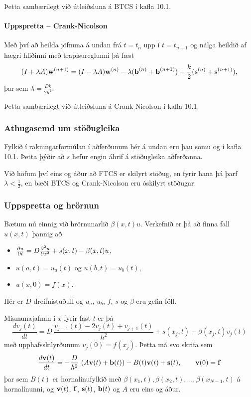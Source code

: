 \documentclass[icelandic,a4paper,12pt]{article}
\begin{document}
    \smallskip
    Þetta sambærilegt við útleiðsluna á BTCS í kafla 10.1.
  
  
\paragraph{Uppspretta -- Crank-Nicolson}
   Með því að heilda jöfnuna á undan frá $t=t_n$ upp í $t=t_{n+1}$
   og nálga heildið af hægri hliðinni með trapisureglunni þá fæst
   $$
     (I+\lambda A)\mbox{${\bf w}$}^{(n+1)} = (I-\lambda A)\mbox{${\bf w}$}^{(n)} 
     - \lambda (\mbox{${\bf b}$}^{(n)}+\mbox{${\bf b}$}^{(n+1)}) + \frac k2(\mbox{${\bf s}$}^{(n)}+\mbox{${\bf s}$}^{(n+1)}),
    $$
þar sem $\lambda = \frac{Dk}{2h^2}$. \pause
    
    \smallskip
    Þetta sambærilegt við útleiðsluna á Crank-Nicolson í kafla 10.1.
  
  
  \subsubsection{Athugasemd um stöðugleika}
   Fylkið í rakningarformúlan í aðferðunum hér á undan eru þau sömu og í
   kafla 10.1. Þetta þýðir að $s$ hefur engin áhrif á stöðugleika aðferðanna.
   \pause
   \medskip
   
   Við höfum því eins og áður að FTCS er skilyrt stöðug, en fyrir hana þá þarf 
   $\lambda < \frac 12$, en bæði BTCS og Crank-Nicolson eru 
   óskilyrt stöðugar.
  

  \subsubsection{Uppspretta og hrörnun}
   Bætum nú einnig við hrörnunarlið $\beta(x,t)u$. \pause
   Verkefnið er þá að finna fall $u(x,t)$ þannig að 
   \begin{itemize}
 \item $\frac{{\partial} u}{{\partial} t} =  D \frac{{\partial}^2 u}{{\partial} x^2} + s(x,t) - \beta(x,t)u$,
 \item $u(a,t) = u_a(t)$ og $u(b,t) = u_b(t)$, 
 \item $u(x,0) = f(x)$.
\end{itemize}
Hér er $D$ dreifnistuðull og $u_a$, $u_b$, $f$, $s$ og $\beta$ eru gefin
föll.



Mismunajafnan í $x$ fyrir fast $t$ er þá 
 $$ 
 \frac{d v_j(t)}{d t} =  D\  \frac{v_{j-1}(t) -2 v_j(t) + v_{j+1}(t)}{h^2} + 
 s(x_j,t) - \beta(x_j,t)v_j(t)
 $$ \pause
 með upphafsskilyrðunum $v_j(0) = f(x_j)$. \pause
 Þetta má svo skrifa sem
 $$ 
 \frac{d \mbox{${\bf v}$}(t)}{d t} =  -\frac{D}{h^2}\  (A\mbox{${\bf v}$}(t) + \mbox{${\bf b}$}(t)) 
 -B(t)\mbox{${\bf v}$}(t) + \mbox{${\bf s}$}(t), \qquad \mbox{${\bf v}$}(0)=\mbox{${\bf f}$}
 $$
 þar sem $B(t)$ er hornalínufylkið með 
 $\beta(x_1,t), \beta(x_2,t),\ldots,\beta(x_{N-1},t)$ á hornalínunni, \pause
 og $\mbox{${\bf v}$}(t)$,  $\mbox{${\bf f}$}$, $\mbox{${\bf s}$}(t)$, $\mbox{${\bf b}$}(t)$ og $A$ eru eins og áður.
  
\end{document}
